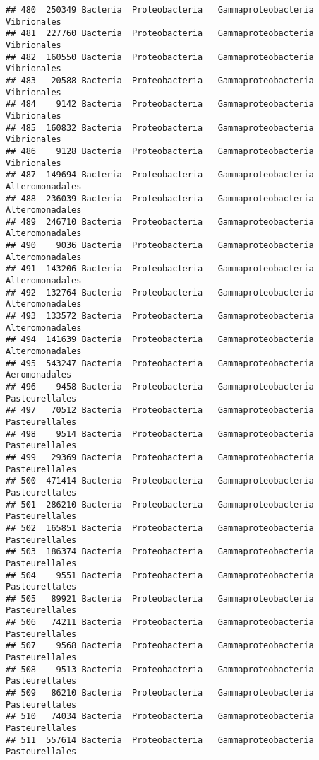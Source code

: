 \documentclass[
]{article}
\begin{document}
\begin{verbatim}
## 480  250349 Bacteria  Proteobacteria   Gammaproteobacteria         Vibrionales
## 481  227760 Bacteria  Proteobacteria   Gammaproteobacteria         Vibrionales
## 482  160550 Bacteria  Proteobacteria   Gammaproteobacteria         Vibrionales
## 483   20588 Bacteria  Proteobacteria   Gammaproteobacteria         Vibrionales
## 484    9142 Bacteria  Proteobacteria   Gammaproteobacteria         Vibrionales
## 485  160832 Bacteria  Proteobacteria   Gammaproteobacteria         Vibrionales
## 486    9128 Bacteria  Proteobacteria   Gammaproteobacteria         Vibrionales
## 487  149694 Bacteria  Proteobacteria   Gammaproteobacteria     Alteromonadales
## 488  236039 Bacteria  Proteobacteria   Gammaproteobacteria     Alteromonadales
## 489  246710 Bacteria  Proteobacteria   Gammaproteobacteria     Alteromonadales
## 490    9036 Bacteria  Proteobacteria   Gammaproteobacteria     Alteromonadales
## 491  143206 Bacteria  Proteobacteria   Gammaproteobacteria     Alteromonadales
## 492  132764 Bacteria  Proteobacteria   Gammaproteobacteria     Alteromonadales
## 493  133572 Bacteria  Proteobacteria   Gammaproteobacteria     Alteromonadales
## 494  141639 Bacteria  Proteobacteria   Gammaproteobacteria     Alteromonadales
## 495  543247 Bacteria  Proteobacteria   Gammaproteobacteria       Aeromonadales
## 496    9458 Bacteria  Proteobacteria   Gammaproteobacteria      Pasteurellales
## 497   70512 Bacteria  Proteobacteria   Gammaproteobacteria      Pasteurellales
## 498    9514 Bacteria  Proteobacteria   Gammaproteobacteria      Pasteurellales
## 499   29369 Bacteria  Proteobacteria   Gammaproteobacteria      Pasteurellales
## 500  471414 Bacteria  Proteobacteria   Gammaproteobacteria      Pasteurellales
## 501  286210 Bacteria  Proteobacteria   Gammaproteobacteria      Pasteurellales
## 502  165851 Bacteria  Proteobacteria   Gammaproteobacteria      Pasteurellales
## 503  186374 Bacteria  Proteobacteria   Gammaproteobacteria      Pasteurellales
## 504    9551 Bacteria  Proteobacteria   Gammaproteobacteria      Pasteurellales
## 505   89921 Bacteria  Proteobacteria   Gammaproteobacteria      Pasteurellales
## 506   74211 Bacteria  Proteobacteria   Gammaproteobacteria      Pasteurellales
## 507    9568 Bacteria  Proteobacteria   Gammaproteobacteria      Pasteurellales
## 508    9513 Bacteria  Proteobacteria   Gammaproteobacteria      Pasteurellales
## 509   86210 Bacteria  Proteobacteria   Gammaproteobacteria      Pasteurellales
## 510   74034 Bacteria  Proteobacteria   Gammaproteobacteria      Pasteurellales
## 511  557614 Bacteria  Proteobacteria   Gammaproteobacteria      Pasteurellales

\end{verbatim}
\end{document}
